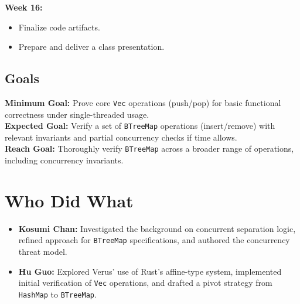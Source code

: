 \documentclass[conference]{IEEEtran}
\begin{document}
\noindent\textbf{Week 16:}
\begin{itemize}
\item Finalize code artifacts.
\item Prepare and deliver a class presentation.
\end{itemize}

\subsection{Goals}
\noindent\textbf{Minimum Goal:} Prove core \texttt{Vec} operations (push/pop) for basic functional correctness under single-threaded usage.\\
\textbf{Expected Goal:} Verify a set of \texttt{BTreeMap} operations (insert/remove) with relevant invariants and partial concurrency checks if time allows.\\
\textbf{Reach Goal:} Thoroughly verify \texttt{BTreeMap} across a broader range of operations, including concurrency invariants.

\section{Who Did What}
\begin{itemize}
\item \textbf{Kosumi Chan:} Investigated the background on concurrent separation logic, refined approach for \texttt{BTreeMap} specifications, and authored the concurrency threat model.
\item \textbf{Hu Guo:} Explored Verus' use of Rust's affine-type system, implemented initial verification of \texttt{Vec} operations, and drafted a pivot strategy from \texttt{HashMap} to \texttt{BTreeMap}.
\end{itemize}
\end{document}
